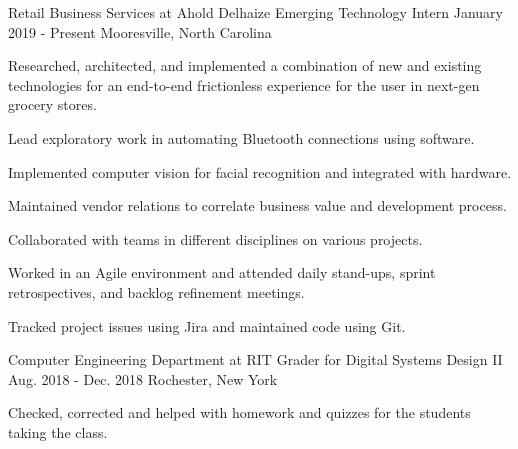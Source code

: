 

\begin{cventries}

\cventry
{Retail Business Services at Ahold Delhaize} %
{Emerging Technology Intern} %
{January 2019 - Present} %
{Mooresville, North Carolina} %
{ %
\vspace{0.5mm}
\begin{cvitems}
\item {Researched, architected, and implemented a combination of new and existing technologies for an end-to-end frictionless experience for the user in next-gen grocery stores.}
\item {Lead exploratory work in automating Bluetooth connections using software.}
\item {Implemented computer vision for facial recognition and integrated with hardware.}
\item {Maintained vendor relations to correlate business value and development process.}
\item {Collaborated with teams in different disciplines on various projects.}
\item {Worked in an Agile environment and attended daily stand-ups, sprint retrospectives, and backlog refinement meetings.}
\item {Tracked project issues using Jira and maintained code using Git.}
\end{cvitems}
}


\cventry
{Computer Engineering Department at RIT} %
{Grader for Digital Systems Design II} %
{Aug. 2018 - Dec. 2018} %
{Rochester, New York} %
{ %
\vspace{0.5mm}
\begin{cvitems}
\item {Checked, corrected and helped with homework and quizzes for the students taking the class.}
\end{cvitems}
}



\end{cventries}
